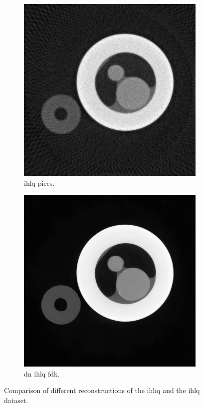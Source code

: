 \begin{figure}
    \medskip
  
    \begin{subfigure}[t]{.45\textwidth}
      \centering
      \includegraphics[width=\linewidth]{figures/kimrobertPICCS.png}
      \caption{\acrlong{ihlq} \acrshort{piccs}. }
    \end{subfigure}
    \hfill
    \begin{subfigure}[t]{.45\textwidth}
      \centering
      \includegraphics[width=\linewidth]{figures/kimrobertdepth1dn.png}
      \caption{\acrlong{dn} \acrlong{ihlq} \acrshort{fdk}. }
    \end{subfigure}
    \caption[Comparison of different reconstructions of IHHQ and IHLQ]{Comparison of different reconstructions of the \acrshort{ihhq} and the \acrshort{ihlq} dataset. }
    \label{fig:kimrobertcomparison}
\end{figure}
